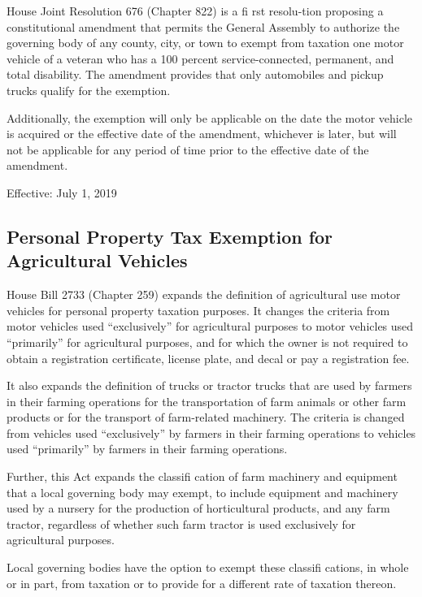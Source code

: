 \documentclass[
]{book}
\begin{document}
House Joint Resolution 676 (Chapter 822) is a fi rst resolu-tion proposing a constitutional amendment that permits the General Assembly to authorize the governing body of any county, city, or town to exempt from taxation one motor vehicle of a veteran who has a 100 percent service-connected, permanent, and total disability. The amendment provides that only automobiles and pickup trucks qualify for the exemption.

Additionally, the exemption will only be applicable on the date the motor vehicle is acquired or the effective date of the amendment, whichever is later, but will not be applicable for any period of time prior to the effective date of the amendment.

Effective: July 1, 2019

\hypertarget{personal-property-tax-exemption-for-agricultural-vehicles}{%
\subsection{Personal Property Tax Exemption for Agricultural Vehicles}\label{personal-property-tax-exemption-for-agricultural-vehicles}}

House Bill 2733 (Chapter 259) expands the definition of agricultural use motor vehicles for personal property taxation purposes. It changes the criteria from motor vehicles used ``exclusively'' for agricultural purposes to motor vehicles used ``primarily'' for agricultural purposes, and for which the owner is not required to obtain a registration certificate, license plate, and decal or pay a registration fee.

It also expands the definition of trucks or tractor trucks that are used by farmers in their farming operations for the transportation of farm animals or other farm products or for the transport of farm-related machinery. The criteria is changed from vehicles used ``exclusively'' by farmers in their farming operations to vehicles used ``primarily'' by farmers in their farming operations.

Further, this Act expands the classifi cation of farm machinery and equipment that a local governing body may exempt, to include equipment and machinery used by a nursery for the production of horticultural products, and any farm tractor, regardless of whether such farm tractor is used exclusively for agricultural purposes.

Local governing bodies have the option to exempt these classifi cations, in whole or in part, from taxation or to provide for a different rate of taxation thereon.
\end{document}

